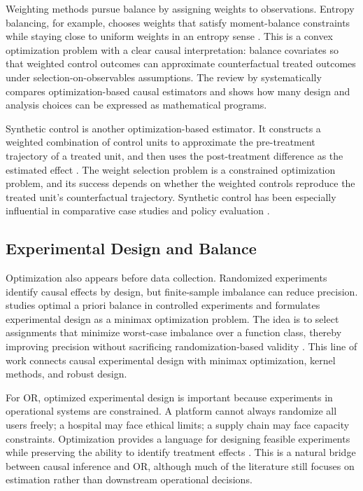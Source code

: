 \documentclass[11pt]{article}
\begin{document}
Weighting methods pursue balance by assigning weights to observations. Entropy balancing, for example, chooses weights that satisfy moment-balance constraints while staying close to uniform weights in an entropy sense \citep{hainmueller2012entropy}. This is a convex optimization problem with a clear causal interpretation: balance covariates so that weighted control outcomes can approximate counterfactual treated outcomes under selection-on-observables assumptions. The review by \citet{cousineau2023optimization} systematically compares optimization-based causal estimators and shows how many design and analysis choices can be expressed as mathematical programs.

Synthetic control is another optimization-based estimator. It constructs a weighted combination of control units to approximate the pre-treatment trajectory of a treated unit, and then uses the post-treatment difference as the estimated effect \citep{abadie2010synthetic}. The weight selection problem is a constrained optimization problem, and its success depends on whether the weighted controls reproduce the treated unit's counterfactual trajectory. Synthetic control has been especially influential in comparative case studies and policy evaluation \citep{abadie2010synthetic}.

\subsection{Experimental Design and Balance}

Optimization also appears before data collection. Randomized experiments identify causal effects by design, but finite-sample imbalance can reduce precision. \citet{kallus2018balance} studies optimal a priori balance in controlled experiments and formulates experimental design as a minimax optimization problem. The idea is to select assignments that minimize worst-case imbalance over a function class, thereby improving precision without sacrificing randomization-based validity \citep{kallus2018balance}. This line of work connects causal experimental design with minimax optimization, kernel methods, and robust design.

For OR, optimized experimental design is important because experiments in operational systems are constrained. A platform cannot always randomize all users freely; a hospital may face ethical limits; a supply chain may face capacity constraints. Optimization provides a language for designing feasible experiments while preserving the ability to identify treatment effects \citep{kallus2018balance}. This is a natural bridge between causal inference and OR, although much of the literature still focuses on estimation rather than downstream operational decisions.
\end{document}
